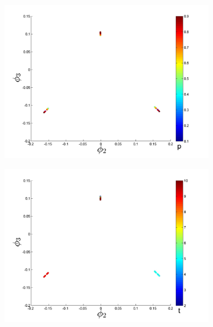 \documentclass[prl, reprint, final, showkeys]{revtex4-1}
\begin{document}

\begin{figure}[t]
\begin{subfigure}{0.2\textwidth}
\includegraphics[width=\textwidth]{rawhist_p_1}
\caption{}
\end{subfigure}
\begin{subfigure}{0.2\textwidth}
\includegraphics[width=\textwidth]{rawhist_t_1}
\caption{}
\end{subfigure}
\begin{subfigure}{0.2\textwidth}

\end{subfigure}
\end{figure}
\end{document}
